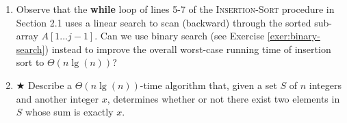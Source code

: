 \documentclass[Chapter02]{subfiles}
\begin{document}
\begin{enumerate}[leftmargin=\labelsep]
\begin{answer}
		\end{answer}

		\item Observe that the \textbf{while} loop of lines 5-7 of the \textsc{Insertion-Sort} procedure in Section 2.1 uses a linear search to scan (backward) through the sorted sub-array $A[1 \dots j - 1]$. Can we use binary search (see Exercise \ref{exer:binary-search}) instead to improve the overall worst-case running time of insertion sort to $\Theta(n \lg(n))$?
		\begin{answer}
			
		\end{answer}

		\item $\bigstar$ Describe a $\Theta(n \lg(n))$-time algorithm that, given a set $S$ of $n$ integers and another integer $x$, determines whether or not there exist two elements in $S$ whose sum is exactly $x$.
		\begin{answer}
			
		\end{answer}

		
	\end{enumerate}
\end{document}
